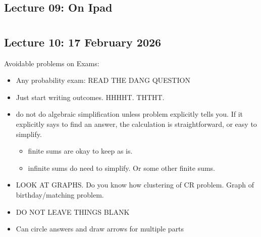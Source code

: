 \documentclass{report}
\begin{document}

\chapter{}
\section{Lecture 09: On Ipad}


\chapter{}
\section{Lecture 10: 17 February 2026}

Avoidable problems on Exams: 

\begin{itemize}
	\item Any probability exam: READ THE DANG QUESTION
	\item Just start writing outcomes. HHHHT. THTHT. 
	\item do not do algebraic simplification unless problem explicitly tells you. If it explicitly says to find an answer, the calculation is straightforward, or easy to simplify. 
		\begin{itemize}
			\item finite sums are okay to keep as is. 
			\item infinite sums do need to simplify. Or some other finite sums. 
		\end{itemize}
	\item LOOK AT GRAPHS. Do you know how clustering of CR problem. Graph of birthday/matching problem. 
	\item DO NOT LEAVE THINGS BLANK
	\item Can circle answers and draw arrows for multiple parts 
\end{itemize}
\end{document}
